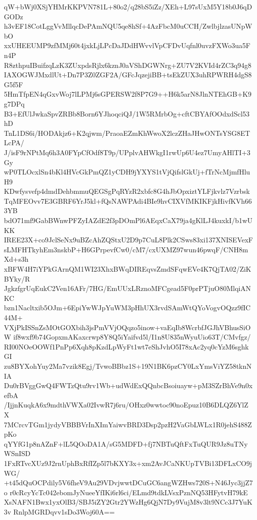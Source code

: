 qW+bWj0XSjYHMrKKPVN781L+80o2/q28bS5iZz/XEh+L97sUxM5Y18b0J6qDGODz
h3vEF18CotLggVvMllqcDePAmNQU5qe8hSf+4AzFbcM0uCCH/ZwlbjlzasUNpWbO
xxUHEEUMP9zfMMj60t4jxkLjLPcDaJDdHWvvlVpCFDvUqfnl0uvzFXWo3ua5Fn4P
R8zthpuIBuifzqLzK3ZUxpdsRjlx6kznJ0aVShDGWNrg+ZU7V2KVId4rZC3q94g8
IAXOGWJMxdlUt+Dn7P3Z0ZGF2A/GFcJqzejiBB+tsEkZUX3uhRPWRH4dgS8G5f5F
5HmTfpEN4qGxvWoj7lLPMj6sGPERSW2f8P7G9++H6k5arN8JlnNTEhGB+K9g7DPq
B3+EfUlJwkaSpvZRBb8Born6YJhoqciQJ/1W5RMrbOg+cftCBYAfOOdxdScl53hD
TnL1DS6i/HODAkjz6+K2qjwm/PraoaEZmKhWwoX2lczZHaJHwONTsYSG8ETLcPA/
J/isF9rNPtMq6h3A0FYpCfOdf8T9p/UPplvAHWkgI1rwUp6U4ez7UmyAHlTI+3Gy
wP0TLOcxlSn4bKl4HVcGkPmQZ1yCDH9jYXYS1tVjQifslGkUj+fTrNcMjmfHluH9
KDwfysvefp4dmdDehbmmuQEGSgPqRYzR2xbfc8G4hJbOpxiztYLFjkvlz7Vzrbsk
TqMFEOvv7E3GBRF6YrJ5kl+fQsNAWPAdi4BIe9hvCIXVfMKIKFjkHivfKVh663YB
bdO71mf9GabBWnwPFZyIAZdE2f3pDOmPl6AEqxCaX79ja4gKlLJ4kuxkI/b1wUKK
IREE23X+co9JclSeNx9uBZcAhZQStxU2D9p7CuL8Plk2CSws83xi137XNISEVexF
sLMFHTkyhEm3nskbP+H6GPrpevfCw0/cM7/cxUXMZ97wun46pwqF/CNH8mXd+s3h
xBFW4H7iYPkGArnQM1WI23XhxBWqDIREqvsZmdSFqwEVe4K7QjTA02/ZiKBYky/R
JgkzfgrUqEukC2Ven16AFr/7HG/EmUUxLRznoMFCgead5F0prPTjuO80MlqiANKC
bzn1Nacltxib5OJm+6EpiYwWJpYuWM3pHhUX3rvdSAmWtQYoVogvOQzz9fIC44M+
VXjPkISSnZsMOtGOXbih3jsPmVVjOQqzo5inow+vaEqIb8WcrbfJGJhVBhusSiOW
if8wxf9b74GopxmAKaxcrwp8Y8Q5iYaifvd5l/I1n8U835nWyuUio63T/CMvfgz/
RI00NOeOOWf1PnPp6Xqh8pKzdLpWyFt1wt7eShJvhO5I78xAc2yq0cYzM6sghkGI
zu8BYXohYuy2Ma7vzik8Egj/TvwoBBbz1S+19N1BK6pzCY0LxYmsViYZ58tknNIA
Du0rBVggGwQ4FWTzQtu9rv1Wb+udWdExQQnbcBsoiuayw+pM3SZrBhVe9n0xefbA
/IjjnKuqkA6x9mdthVWXa02IvwR7j6ru/OHxz0wwtoc90noEpuz10B6DLQZ6YlZX
7MCrcvTGm1jydyVBBBVrInXImYaiwvBRD3Dsp2pzH2VaGbLWLx1R0jehS488ZpKo
qYYfG1p8nAZnF+lL5QOoDA1A/sG5MDFD+fj7NBTuQftFxTuQUR9Jz8uTNyWSnISD
1FxRTvcXUz9J2rnUphBxRfIZp5l7bKXY3x+xm2AvJCaNKUpTVBi13DFLxCO9jWG/
+t45dQuOCPdily5V6fheV9Au29VDvjwwtDCuGC6angWZHws720S+N46Jyc3jjZ7o
r0cRcyYcTc042ebomJyNueeYfIKi6rl6ci/ELmd9tdkLVsxPznNQ53HFytvH79kE
XsNAFN1Bwx1yxOlB3/SBJ5iZY2Gtr2YWzHg6QjN7Dy9VujM8v3lt9NCc3J7YuK3v
RnlpMGRDqvv1sDo3Woj60A==
